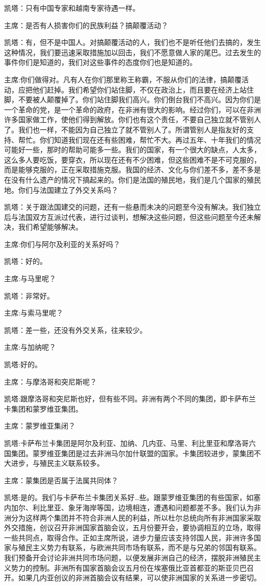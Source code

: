 凯塔：只有中国专家和越南专家待遇一样。

主席：是否有人损害你们的民族利益？搞颠覆活动？

凯塔：有，但不是中国人。对搞颠覆活动的人，我们也不是听任他们去搞的，发生这种情况，我们要迅速采取措施加以回击，我们不愿意做人家的尾巴。过去发生的事件你们是知道的，我们对这些事件的态度你们也是知道的。

主席:你们做得对。凡有人在你们那里称王称霸，不服从你们的法律，搞颠覆活动，应把他们赶掉。我们希望你们站住脚，不仅在政治上，而且要在经济上站住脚，不要被人颠覆掉了。你们站住脚我们高兴。你们倒台我们不高兴。因为你们是一个革命的党，是一个革命的政府，在非洲有很大的影响。经过你们，可以在非洲许多国家做工作，使他们得到解放。你们也有这个责任，不要自己独立就不管别人了。我们也一样，不能因为自己独立了就不管别人了。所谓管别人是指友好的支持、帮忙。你们知道我们现在还有些困难，帮忙不大。再过五年、十年我们的情况可能好一些，那时的帮助可能多一些。我们的国家，有一个很大的缺点，人太多，这么多人要吃饭，要穿衣，所以现在还有不少困难，但这些困难不是不可克服的，而是能够克服的，正在采取措施克服。我国的经济、文化与你们差不多，差不多是在没有什么遗产的情况下搞起来的。你们是法国的殖民地，我们是几个国家的殖民地。你们与法国建立了外交关系吗？

凯塔：关于跟法国建交的问题，还有一些悬而未决的问题至今没有解决。我们独立后与法国双方互派过代表，进行过谈判，想解决这些问题，但这些问题至今还未解决，我们希望能够解决。

主席:你们与阿尔及利亚的关系好吗？

凯塔：好的。

主席:与马里呢？

凯塔：非常好。

主席:与索马里呢？

凯塔：差一些，还没有外交关系，往来较少。

主席:与加纳呢？

凯塔:好的。

主席：与摩洛哥和突尼斯呢？

凯塔:跟摩洛哥和突尼斯也好，但有些不同。非洲有两个不同的集团，即卡萨布兰卡集团和蒙罗维亚集团。

主席：蒙罗维亚集闭？

凯塔:卡萨布兰卡集团是阿尔及利亚、加纳、几内亚、马里、利比里亚和摩洛哥六国集团。蒙罗维亚集团是过去非洲马尔加什联盟的国家。卡集团较进步，蒙集团不大进步，与殖民主义联系较多。

主席：蒙集团是否属于法属共同体？

凯塔:是的。我们与卡萨布兰卡集团关系好…些。跟蒙罗维亚集团的有些国家，如塞内加尔、利比里亚、象牙海岸等国，边境相连，遭遇和问题都差不多。我们认为非洲分为这样两个集团并不符合非洲人民的利益，所以杜尔总统向所有非洲国家采取外交措施，创议召开非洲国家首脑会议，五月份要开会，要协调相互的立场，取得一些共同点，取得合作。正如主席所说，进步力量应该支持邻国人民，非洲许多国家与殖民主义势力有联系，与欧洲共同市场有联系，而不是与兄弟的邻国有联系。我们预备开会讨论非洲共同市场问题，以便发展非洲自己的经济，摆脱非洲殖民主义势力的控制。非洲所有国家首脑会议五月份在埃塞俄比亚首都亚的斯亚贝巴召开。如果几内亚创议的非洲首脑会议有结果，可以使非洲国家的关系进一步密切。

